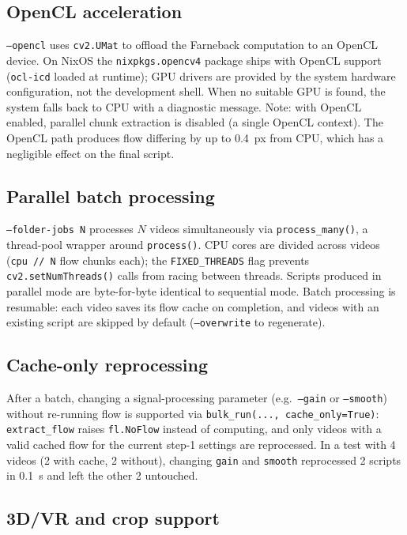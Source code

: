 \documentclass[12pt,a4paper]{article}
\begin{document}
\subsection{OpenCL acceleration}

\texttt{--opencl} uses \texttt{cv2.UMat} to offload the Farneback computation
to an OpenCL device. On NixOS the \texttt{nixpkgs.opencv4} package ships with
OpenCL support (\texttt{ocl-icd} loaded at runtime); GPU drivers are provided
by the system hardware configuration, not the development shell. When no
suitable GPU is found, the system falls back to CPU with a diagnostic message.
Note: with OpenCL enabled, parallel chunk extraction is disabled (a single
OpenCL context). The OpenCL path produces flow differing by up to 0.4~px from
CPU, which has a negligible effect on the final script.

\subsection{Parallel batch processing}

\texttt{--folder-jobs N} processes $N$ videos simultaneously via
\texttt{process\_many()}, a thread-pool wrapper around \texttt{process()}.
CPU cores are divided across videos (\texttt{cpu // N} flow chunks each);
the \texttt{FIXED\_THREADS} flag prevents \texttt{cv2.setNumThreads()} calls
from racing between threads. Scripts produced in parallel mode are
byte-for-byte identical to sequential mode. Batch processing is resumable:
each video saves its flow cache on completion, and videos with an existing
script are skipped by default (\texttt{--overwrite} to regenerate).

\subsection{Cache-only reprocessing}

After a batch, changing a signal-processing parameter (e.g.\ \texttt{--gain}
or \texttt{--smooth}) without re-running flow is supported via
\texttt{bulk\_run(..., cache\_only=True)}: \texttt{extract\_flow} raises
\texttt{fl.NoFlow} instead of computing, and only videos with a valid cached
flow for the current step-1 settings are reprocessed. In a test with 4 videos
(2 with cache, 2 without), changing \texttt{gain} and \texttt{smooth}
reprocessed 2 scripts in 0.1~s and left the other 2 untouched.

\subsection{3D/VR and crop support}
\end{document}
